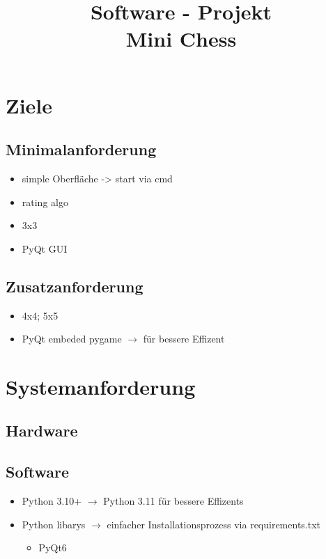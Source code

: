 \documentclass{article}
\title{\textbf{Software - Projekt\\Mini Chess}}
\date{\vspace{-5ex}}
\begin{document}
\maketitle
\thispagestyle{fancy}


\tableofcontents
\newpage


\section{Ziele}\label{section-goals}

\subsection{Minimalanforderung}
\begin{itemize}
    \item simple Oberfläche -> start via cmd
    \item rating algo
    \item 3x3
    \item PyQt GUI
\end{itemize}

\subsection{Zusatzanforderung}
\begin{itemize}
    \item 4x4; 5x5
    \item PyQt embeded pygame $\rightarrow$ für bessere Effizent
\end{itemize}


\newpage
\section{Systemanforderung}\label{section-requirements}

\subsection{Hardware}

\subsection{Software}
\begin{itemize}
    \item Python 3.10+ $\rightarrow$ Python 3.11 für bessere Effizents
    \item Python libarys $\rightarrow$ einfacher Installationsprozess via requirements.txt
        \begin{itemize}
            \item PyQt6
        \end{itemize}
\end{itemize}
\end{document}
